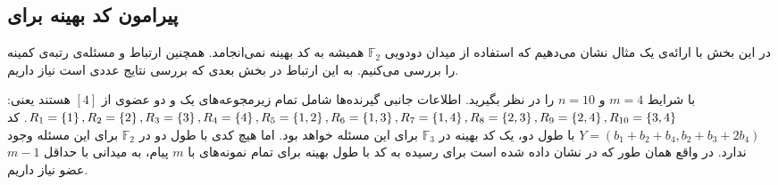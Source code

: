 \subsection{
    پیرامون کد بهینه برای
    \picod
}
در این بخش با ارائه‌ی یک مثال نشان می‌دهیم که استفاده از میدان دودویی
$\mathbb{F}_2$
همیشه به کد بهینه نمی‌انجامد. همچنین ارتباط
\picod
و مسئله‌ی رتبه‌ی کمینه را بررسی می‌کنیم. به این ارتباط در بخش بعدی که بررسی نتایج عددی است نیاز داریم.
\begin{example}
    \picod
    با شرایط
    $m = 4$
    و
    $n = 10$
    را در نظر بگیرید. اطلاعات جانبی گیرنده‌ها شامل تمام زیرمجوعه‌های یک و دو عضوی از
    $[4]$
    هستند یعنی:
    $R_1 = \left\{ 1 \right\}, R_2 = \left\{ 2 \right\}, R_3 = \left\{ 3 \right\}, R_4 = \left\{ 4 \right\}, R_5 = \left\{ 1, 2 \right\}, R_6 = \left\{ 1, 3 \right\}, R_7 = \left\{ 1, 4 \right\}, R_8 = \left\{ 2, 3 \right\}, R_9 = \left\{ 2, 4 \right\}, R_{10} = \left\{ 3, 4 \right\}$. کد
    $Y = (b_1 + b_2 + b_4, b_2+b_3+2b_4)$
    با طول دو، یک کد بهینه در
    $\mathbb{F}_3$
    برای این مسئله خواهد بود. اما هیچ کدی با طول دو در
    $\mathbb{F}_2$
    برای این مسئله وجود ندارد. در واقع همان طور که در
    \cite{song2016deterministic}
    نشان داده شده است برای رسیده به کد با طول بهینه برای تمام نمونه‌های با
    $m$
    پیام، به میدانی با حداقل
    $m - 1$
    عضو نیاز داریم.
\end{example}

